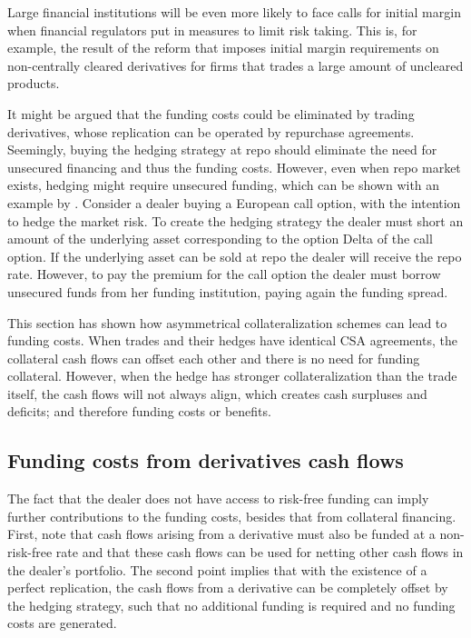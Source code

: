 \documentclass[main.tex]{subfiles}
\begin{document}
        Large financial institutions will be even more likely to face calls for initial margin
        when financial regulators put in measures to limit risk taking.
        This is, for example, the result of the reform \textcite{BCBC2020}
        that imposes initial margin requirements on non-centrally cleared derivatives for 
        firms that trades a large amount of uncleared products.

        It might be argued that the funding costs could be eliminated by trading derivatives,
        whose replication can be operated by repurchase agreements. 
        Seemingly, buying the hedging strategy at repo should eliminate the need for unsecured financing
        and thus the funding costs. 
        However, even when repo market exists, hedging might require unsecured funding,
        which can be shown with an example by \textcite{Castagna2012FVA}.
        Consider a dealer buying a European call option, with the intention to hedge the market risk.
        To create the hedging strategy the dealer must short an amount of the underlying asset corresponding to the option Delta of the call option.
        If the underlying asset can be sold at repo the dealer will receive the repo rate.
        However, to pay the premium for the call option the dealer must borrow unsecured funds from her funding institution,
        paying again the funding spread. 

        This section has shown how asymmetrical collateralization schemes
        can lead to funding costs. 
        When trades and their hedges have identical CSA agreements, 
        the collateral cash flows can offset each other and there is no need for funding collateral.
        However, when the hedge has stronger collateralization than the trade itself,
        the cash flows will not always align, which creates cash surpluses and deficits;
        and therefore funding costs or benefits.
        
    \subsection{Funding costs from derivatives cash flows}
        The fact that the dealer does not have access to risk-free funding
        can imply further contributions to the funding costs, besides that from collateral financing.
        First, note that cash flows arising from a derivative must also be funded at a non-risk-free rate
        and that these cash flows can be used for netting other cash flows in the dealer's portfolio.
        The second point implies that with the existence of a perfect replication,
        the cash flows from a derivative can be completely offset by the hedging strategy,
        such that no additional funding is required and no funding costs are generated.
\end{document}
